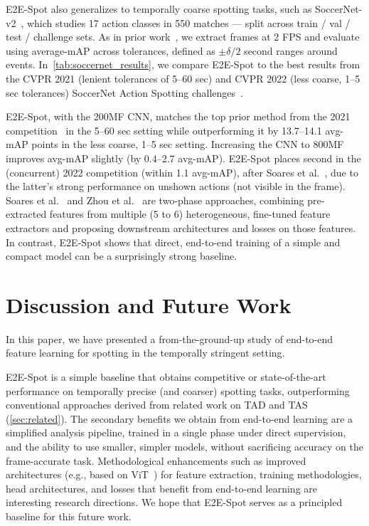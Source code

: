 \documentclass[runningheads]{llncs}
\newcommand{\notation}[1]{\ensuremath{#1}\xspace}
\newcommand{\OURMETHOD}{{E2E-Spot}\xspace}
\newcommand{\soccernet}{{SoccerNet-v2}\xspace}
\newcommand{\Tolerance}{\notation{\delta}}
\begin{document}
\OURMETHOD also generalizes to temporally coarse spotting tasks, such as \soccernet~\cite{soccernetv2}, which studies 17 action classes in 550 matches --- split across train / val / test / challenge sets.
As in prior work~\cite{calf,netvladpp,rmsnet}, we extract frames at 2 FPS and evaluate using average-mAP across tolerances, defined as $\pm \Tolerance / 2$ second ranges around events.
In~\autoref{tab:soccernet_results}, we compare \OURMETHOD to the best results from the CVPR 2021 (lenient tolerances of 5--60 sec) and CVPR 2022 (less coarse, 1--5 sec tolerances) SoccerNet Action Spotting challenges~\cite{snspotting}.

\OURMETHOD, with the 200MF CNN, matches the
top prior method from the 2021 competition~\cite{featurecombattention} in the 5--60 sec setting while outperforming it by 13.7--14.1 avg-mAP points in the less coarse, 1--5 sec setting.
Increasing the CNN to 800MF improves avg-mAP slightly (by 0.4--2.7 avg-mAP).
\OURMETHOD places second in the (concurrent) 2022 competition (within 1.1 avg-mAP), after Soares et al.~\cite{densedetectionanchorsrevisited}, due to the latter's strong performance on unshown actions (not visible in the frame).
Soares et al.~\cite{densedetectionanchors,densedetectionanchorsrevisited} and Zhou et al.~\cite{featurecombattention} are two-phase approaches, combining pre-extracted features from multiple (5 to 6) heterogeneous, fine-tuned feature extractors and proposing downstream architectures and losses on those features.
In contrast, \OURMETHOD shows that direct, end-to-end training of a simple and compact model can be a surprisingly strong baseline.
 
\section{Discussion and Future Work}
\label{sec:discussion}

In this paper, we have presented a from-the-ground-up study of end-to-end feature learning for spotting in the temporally stringent setting.

\OURMETHOD is a simple baseline that obtains competitive or state-of-the-art performance on temporally precise (and coarser) spotting tasks, outperforming conventional approaches derived from related work on TAD and TAS (\autoref{sec:related}).
The secondary benefits we obtain from end-to-end learning are a simplified analysis pipeline, trained in a single phase under direct supervision, and the ability to use smaller, simpler models, without sacrificing accuracy on the frame-accurate task.
Methodological enhancements such as improved architectures (e.g., based on ViT~\cite{vit}) for feature extraction, training methodologies, head architectures, and losses that benefit from end-to-end learning are interesting research directions.
We hope that \OURMETHOD serves as a principled baseline for this future work.
\end{document}
